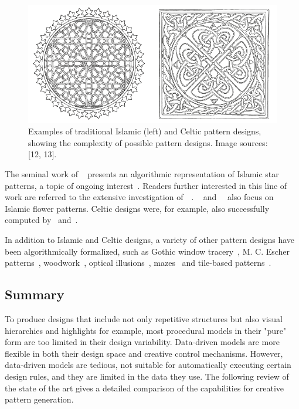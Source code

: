 \begin{figure}
\centering
    \includegraphics[width=0.9\columnwidth]{figures/islamic_celtic_ornament_01.png}
    \caption[Islamic and Celtic pattern designs]{Examples of traditional Islamic (left) and Celtic pattern designs, showing the complexity of possible pattern designs. Image sources: [12, 13].}
\label{fig:islamic_celtic_ornament}
\end{figure}

The seminal work of \citeauthor*{kaplan_2004_isp}~\cite{kaplan_2004_isp} presents an algorithmic representation of Islamic star patterns, a topic of ongoing interest~\cite{khamjane_2018_giq}. Readers further interested in this line of work are referred to the extensive investigation of~\citeauthor*{kaplan_2002_cgg}~\cite{kaplan_2002_cgg}. \citeauthor*{etemad_2008_apf}~\cite{etemad_2008_apf} and~\citeauthor*{hamekasi_2012_dpf}~\cite{hamekasi_2012_dpf} also focus on Islamic flower patterns. Celtic designs were, for example, also successfully computed by~\citeauthor*{kaplan_2003_cgc} and~\cite{doyle_2013_ccc}.

In addition to Islamic and Celtic designs, a variety of other pattern designs have been algorithmically formalized, such as Gothic window tracery~\cite{havemann_2004_gpd}, M. C. Escher patterns~\cite{dunham_1981_crh,kaplan_2004_isp}, woodwork~\cite{gulati_2010_acp,gulati_2012_acp}, optical illusions~\cite{chi_2014_ois}, mazes~\cite{pedersen_2006_ola} and tile-based patterns~\cite{ouyang_2015_cat, gdawiec_2017_pga}.



\subsection{Summary}
\label{subsec:models_summary}

To produce designs that include not only repetitive structures but also visual hierarchies and highlights for example, most procedural models in their "pure" form are too limited in their design variability. Data-driven models are more flexible in both their design space and creative control mechanisms. However, data-driven models are tedious, not suitable for automatically executing certain design rules, and they are limited in the data they use. The following review of the state of the art gives a detailed comparison of the capabilities for creative pattern generation.